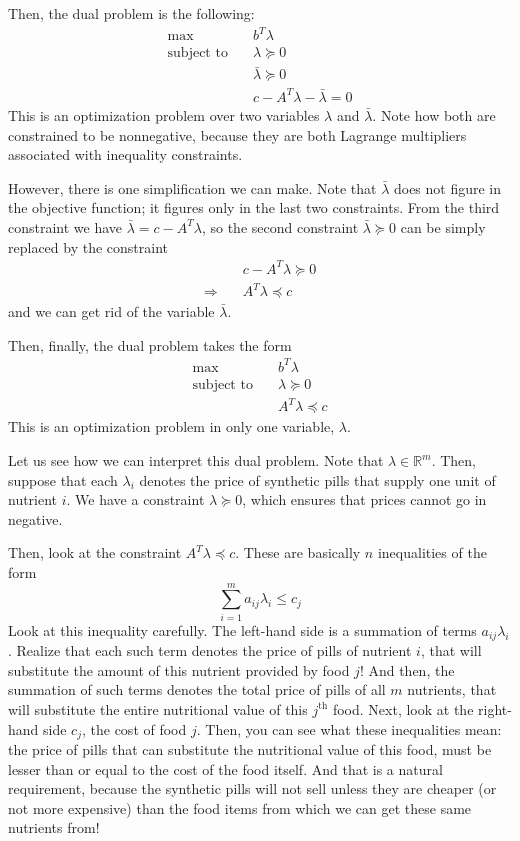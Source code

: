 \documentclass[a4paper]{article}
\theoremstyle{definition}
\begin{document}
Then, the dual problem is the following:
\begin{align*}
	\max \quad & b^T \lambda \\
	\text{subject to} \quad & \lambda \succeq 0 \\
	& \bar{\lambda} \succeq 0 \\
	& c - A^T \lambda - \bar{\lambda} = 0
\end{align*}
This is an optimization problem over two variables $\lambda$ and $\bar{\lambda}$.
Note how both are constrained to be nonnegative, because they are both Lagrange multipliers associated with inequality constraints.

However, there is one simplification we can make.
Note that $\bar{\lambda}$ does not figure in the objective function; it figures only in the last two constraints.
From the third constraint we have $\bar{\lambda} = c - A^T \lambda$, so the second constraint $\bar{\lambda} \succeq 0$ can be simply replaced by the constraint
\begin{align*}
	& c - A^T \lambda \succeq 0 \\
	\Rightarrow \quad & A^T \lambda \preceq c
\end{align*}
and we can get rid of the variable $\bar{\lambda}$.

Then, finally, the dual problem takes the form
\begin{align*}
	\max \quad & b^T \lambda \\
	\text{subject to} \quad & \lambda \succeq 0 \\
	& A^T \lambda \preceq c
\end{align*}
This is an optimization problem in only one variable, $\lambda$.

Let us see how we can interpret this dual problem.
Note that $\lambda \in \mathbb{R}^m$.
Then, suppose that each $\lambda_i$ denotes the price of synthetic pills that supply one unit of nutrient $i$.
We have a constraint $\lambda \succeq 0$, which ensures that prices cannot go in negative.

Then, look at the constraint $A^T \lambda \preceq c$.
These are basically $n$ inequalities of the form
\begin{equation*}
	\sum_{i=1}^m a_{ij} \lambda_i \leq c_j
\end{equation*}
Look at this inequality carefully.
The left-hand side is a summation of terms $a_{ij} \lambda_i$.
Realize that each such term denotes the price of pills of nutrient $i$, that will substitute the amount of this nutrient provided by food $j$!
And then, the summation of such terms denotes the total price of pills of all $m$ nutrients, that will substitute the entire nutritional value of this $j^\text{th}$ food.
Next, look at the right-hand side $c_j$, the cost of food $j$.
Then, you can see what these inequalities mean: the price of pills that can substitute the nutritional value of this food, must be lesser than or equal to the cost of the food itself.
And that is a natural requirement, because the synthetic pills will not sell unless they are cheaper (or not more expensive) than the food items from which we can get these same nutrients from!
\end{document}
